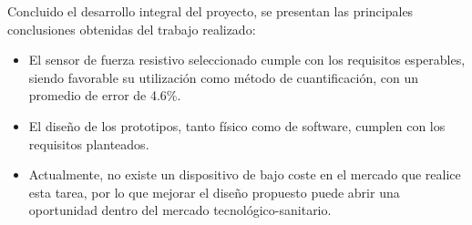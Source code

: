 
Concluido el desarrollo integral del proyecto, se presentan las principales conclusiones obtenidas del trabajo realizado:

\begin{itemize}
    \item El sensor de fuerza resistivo seleccionado cumple con los requisitos esperables, siendo favorable su utilización como método de cuantificación, con un promedio de error de 4.6\%.
    \item El diseño de los prototipos, tanto físico como de software, cumplen con los requisitos planteados. 
    \item Actualmente, no existe un dispositivo de bajo coste en el mercado que realice esta tarea, por lo que mejorar el diseño propuesto puede abrir una oportunidad dentro del mercado tecnológico-sanitario.
\end{itemize}